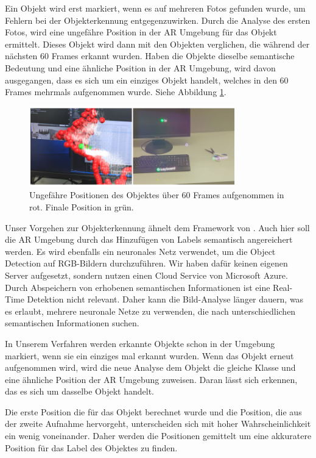 Ein Objekt wird erst markiert, wenn es auf mehreren Fotos gefunden wurde, um Fehlern bei der Objekterkennung entgegenzuwirken. Durch die Analyse des ersten Fotos, wird eine ungefähre Position in der AR Umgebung für das Objekt ermittelt. Dieses Objekt wird dann mit den Objekten verglichen, die während der nächsten 60 Frames erkannt wurden. Haben die Objekte dieselbe semantische Bedeutung und eine ähnliche Position in der AR Umgebung, wird davon ausgegangen, dass es sich um ein einziges Objekt handelt, welches in den 60 Frames mehrmals aufgenommen wurde. Siehe Abbildung \ref{img:60frames}.

\begin{figure}[H]
	\centering
	\includegraphics[width=0.8\textwidth]{images/img_huynh.PNG}
	\caption[]{Ungefähre Positionen des Objektes über 60 Frames aufgenommen in rot. Finale Position in grün.\citep{LabelingLanguageLearning}}
	\label{img:60frames}
\end{figure}

Unser Vorgehen zur Objekterkennung ähnelt dem Framework von \cite{LabelingLanguageLearning}. Auch hier soll die AR Umgebung durch das Hinzufügen von Labels semantisch angereichert werden. Es wird ebenfalls ein neuronales Netz verwendet, um die Object Detection auf RGB-Bildern durchzuführen. Wir haben dafür keinen eigenen Server aufgesetzt, sondern nutzen einen Cloud Service von Microsoft Azure. Durch Abspeichern von erhobenen semantischen Informationen ist eine Real-Time Detektion nicht relevant. Daher kann die Bild-Analyse länger dauern, was es erlaubt, mehrere neuronale Netze zu verwenden, die nach unterschiedlichen semantischen Informationen suchen.

In Unserem Verfahren werden erkannte Objekte schon in der Umgebung markiert, wenn sie ein einziges mal erkannt wurden. Wenn das Objekt erneut aufgenommen wird, wird die neue Analyse dem Objekt die gleiche Klasse und eine ähnliche Position der AR Umgebung zuweisen. Daran lässt sich erkennen, das es sich um dasselbe Objekt handelt.

Die erste Position die für das Objekt berechnet wurde und die Position, die aus der zweite Aufnahme hervorgeht, unterscheiden sich mit hoher Wahrscheinlichkeit ein wenig voneinander. Daher werden die Positionen gemittelt um eine akkuratere Position für das Label des Objektes zu finden. 
\citep{LabelingLanguageLearning}

